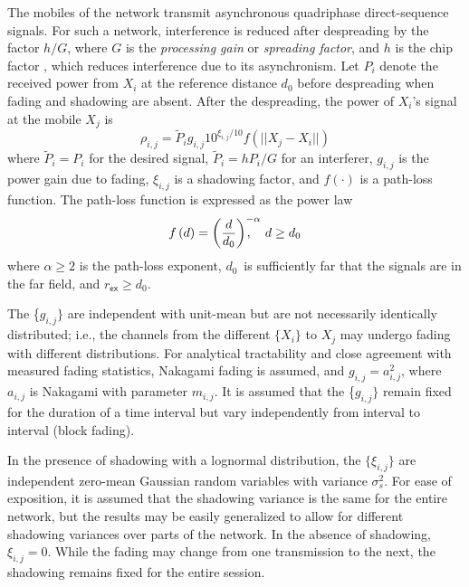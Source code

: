 \documentclass[conference]{IEEEtran}
\begin{document}
The mobiles of the network transmit asynchronous quadriphase direct-sequence
signals. For such a network, interference is reduced after despreading by the
factor $h/G$, where $G$ is the \emph{processing gain} or \emph{spreading
factor}, and $h$ is the chip factor \cite{tor}, which reduces interference
due to its asynchronism. Let ${P}_{i}$ denote the
received power from $X_{i}$ at the reference distance $d_{0}$ before
despreading when fading and shadowing are absent. After the despreading, the
power of $X_{i}$'s signal at the mobile $X_{j}$ is
\begin{equation}
\rho_{i,j}=\tilde{P}_{i}g_{i,j}10^{\xi_{i,j}/10}f\left(  ||X_{j}-X_{i}||\right)  \label{1}\end{equation}
where $\tilde{P}_{i}={P}_{i}$ for the desired signal, $\tilde{P}_{i}=h{P}_{i}/G$ for an interferer, $g_{i,j}$ is the power gain due to fading,
$\xi_{i,j}$ is a shadowing factor, and $f(\cdot)$ is a path-loss function. The
path-loss function is expressed as the power law
\begin{equation}
f\left(  d\right)  =\left(  \frac{d}{d_{0}}\right)  ^{-\alpha}\hspace
{-0.45cm},\,\,\text{ \ }d\geq d_{0} \label{2}\end{equation}
where $\alpha\geq2$ is the path-loss exponent, $d_{0}$\ is sufficiently far
that the signals are in the far field, and $r_{\mathsf{ex}}\geq d_{0}.$

The \{$g_{i,j}\}$ are independent with unit-mean but are not necessarily
identically distributed; i.e., the channels from the different $\{X_{i}\}$ to
$X_{j}$ may undergo fading with different distributions. For analytical
tractability and close agreement with measured fading statistics, Nakagami
fading is assumed, and $g_{i,j}=a_{i,j}^{2}$, where $a_{i,j}$ is Nakagami with
parameter $m_{i,j}$. It is assumed that the \{$g_{i,j}\}$ remain fixed for the
duration of a time interval but vary independently from interval to interval
(block fading).

In the presence of shadowing with a lognormal distribution, the $\{\xi
_{i,j}\}$ are independent zero-mean Gaussian random variables with variance
$\sigma_{s}^{2}$. For ease of exposition, it is assumed that the shadowing
variance is the same for the entire network, but the results may be easily
generalized to allow for different shadowing variances over parts of the
network. In the absence of shadowing, $\xi_{i,j}=0$. While the fading may
change from one transmission to the next, the shadowing remains fixed for the
entire session.
\end{document}
